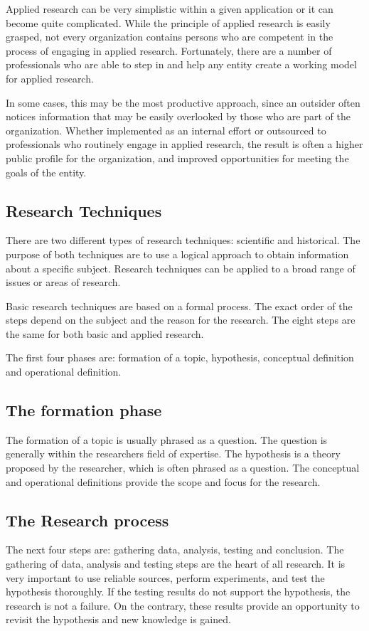 \documentclass[12pt, a4paper]{report}
\begin{document}
Applied research can be very simplistic within a given application or it can become quite complicated. While the principle of applied research is easily grasped, not every organization contains persons who are competent in the process of engaging in applied research. Fortunately, there are a number of professionals who are able to step in and help any entity create a working model for applied research.

In some cases, this may be the most productive approach, since an outsider often notices information that may be easily overlooked by those who are part of the organization. Whether implemented as an internal effort or outsourced to professionals who routinely engage in applied research, the result is often a higher public profile for the organization, and improved opportunities for meeting the goals of the entity.


\subsection{Research Techniques}
There are two different types of research techniques: scientific and historical. The purpose of both techniques are to use a logical approach to obtain information about a specific subject. Research techniques can be applied to a broad range of issues or areas of research.

Basic research techniques are based on a formal process. The exact order of the steps depend on the subject and the reason for the research. The eight steps are the same for both basic and applied research.

The first four phases are: formation of a topic, hypothesis, conceptual definition and operational definition.

\subsection{The formation phase}
The formation of a topic is usually phrased as a question. The question is generally within the researchers field of expertise. The hypothesis is a theory proposed by the researcher, which is often phrased as a question. The conceptual and operational definitions provide the scope and focus for the research.

\subsection{The Research process}
The next four steps are: gathering data, analysis, testing and conclusion. The gathering of data, analysis and testing steps are the heart of all research. It is very important to use reliable sources, perform experiments, and test the hypothesis thoroughly. If the testing results do not support the hypothesis, the research is not a failure. On the contrary, these results provide an opportunity to revisit the hypothesis and new knowledge is gained.
\end{document}
